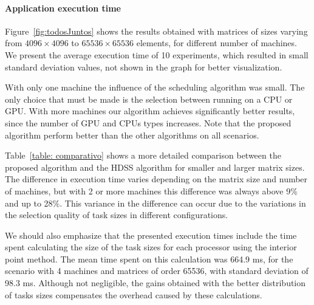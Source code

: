 \documentclass[journal]{IEEEtran}
\begin{document}

\paragraph{Application execution time} Figure~\ref{fig:todosJuntos} shows the 
results obtained with matrices of sizes varying from $4096 \times 4096$ to $65536 \times
65536$ elements, for different number of machines. We present the average
execution time of 10 experiments, which resulted in small standard deviation
values, not shown in the graph for better visualization.


With
only one machine the influence of the scheduling algorithm was small. The only choice that must be made is the selection between running on a 
CPU or GPU.
With more machines our algorithm achieves significantly better
results, since the number of GPU and CPUs types increases. Note that  the proposed algorithm perform better than the other algorithms on
all scenarios.

Table~\ref{table: comparativo} shows a more detailed comparison between the
proposed algorithm and the HDSS algorithm for smaller and larger matrix sizes. The
difference in execution time varies depending on the matrix size and number of
machines, but with 2 or more machines this difference was always above 9\% and up to
28\%. This variance in the difference can occur due to the variations in the
selection quality of task sizes in different configurations.

%
We should also emphasize that the presented execution times include the time spent
calculating the size of the task sizes for each processor using the interior
point method. The mean time spent on this calculation was 664.9 ms, for the scenario with 4 machines and matrices of order 65536, with
standard deviation of 98.3 ms. Although not negligible, the gains obtained with
the better distribution of tasks sizes compensates the overhead caused by these calculations.

\end{document}
